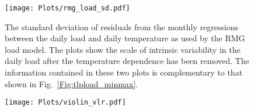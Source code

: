 \documentclass[letterpaper,12pt]{article}
\begin{document}
\begin{figure}
  \texttt{[image: Plots/rmg\_load\_sd.pdf]}
  \caption{The standard deviation of residuals from the monthly
  regressions between the daily load and daily temperature as used by
  the RMG load model.  The plots show the scale of intrinsic
  variability in the daily load after the temperature dependence has
  been removed.  The information contained in these two plots is
  complementary to that shown in Fig.\ \ref{Fig:tlpload_minmax}.  }
\end{figure}
\clearpage                                                              %
\begin{figure}                                                          %
  \texttt{[image: Plots/violin\_vlr.pdf]} %
\end{figure}                                                            %
\end{document}
